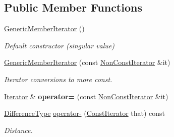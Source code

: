 \subsection*{Public Member Functions}
\begin{DoxyCompactItemize}
\item 
\hyperlink{classGenericMemberIterator_a2708717d497a0aadacdf75900de4c5b4}{Generic\+Member\+Iterator} ()
\begin{DoxyCompactList}\small\item\em Default constructor (singular value) \end{DoxyCompactList}\item 
\hyperlink{classGenericMemberIterator_a2697fd327a90654b0bf91c988e43f95e}{Generic\+Member\+Iterator} (const \hyperlink{classGenericMemberIterator_abc26eb06f2962765b11dcd06ce84ac02}{Non\+Const\+Iterator} \&it)
\begin{DoxyCompactList}\small\item\em Iterator conversions to more const. \end{DoxyCompactList}\item 
\hyperlink{classGenericMemberIterator_ad1cf1ecf6210b47906c9f179c893a8b8}{Iterator} \& {\bfseries operator=} (const \hyperlink{classGenericMemberIterator_abc26eb06f2962765b11dcd06ce84ac02}{Non\+Const\+Iterator} \&it)\hypertarget{classGenericMemberIterator_a4ebb2b80e7d70c11802520ae77958df3}{}\label{classGenericMemberIterator_a4ebb2b80e7d70c11802520ae77958df3}

\item 
\hyperlink{classGenericMemberIterator_a902b99c8ae351cd7626514dc5f30740a}{Difference\+Type} \hyperlink{classGenericMemberIterator_a056851821e75c4be13b297604bc37c0b}{operator-\/} (\hyperlink{classGenericMemberIterator_ae5be27a73dce0be58ee2776db896d591}{Const\+Iterator} that) const \hypertarget{classGenericMemberIterator_a056851821e75c4be13b297604bc37c0b}{}\label{classGenericMemberIterator_a056851821e75c4be13b297604bc37c0b}

\begin{DoxyCompactList}\small\item\em Distance. \end{DoxyCompactList}\end{DoxyCompactItemize}
